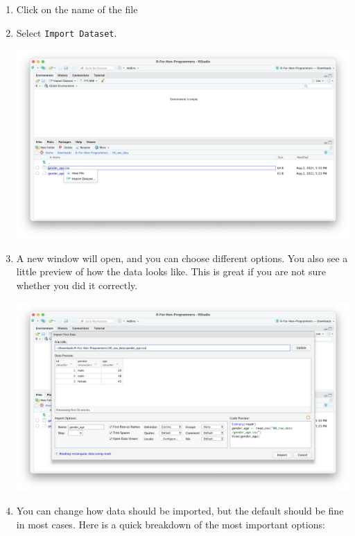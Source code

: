 \documentclass[
]{book}
\begin{document}
\begin{enumerate}
\def\labelenumi{\arabic{enumi}.}
\item
  Click on the name of the file
\item
  Select \texttt{Import\ Dataset}.

  \includegraphics{images/chapter_07_img/01_files_pane_import/01_files_pane_import.png}
\item
  A new window will open, and you can choose different options. You also see a little preview of how the data looks like. This is great if you are not sure whether you did it correctly.

  \includegraphics{images/chapter_07_img/01_files_pane_import/02_files_pane_import.png}
\item
  You can change how data should be imported, but the default should be fine in most cases. Here is a quick breakdown of the most important options:


\end{enumerate}
\end{document}
